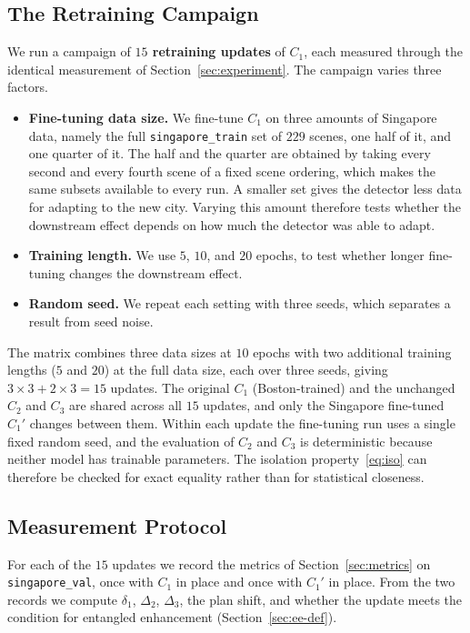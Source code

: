 \documentclass[conference]{IEEEtran}
\begin{document}
\subsection{The Retraining Campaign}
\label{sec:campaign}
We run a campaign of \textbf{$15$ retraining updates} of $C_1$, each measured
through the identical measurement of Section~\ref{sec:experiment}. The campaign varies three factors.
\begin{itemize}
\item \textbf{Fine-tuning data size.} We fine-tune $C_1$ on three amounts of
Singapore data, namely the full \texttt{singapore\_train} set of $229$ scenes,
one half of it, and one quarter of it. The half and the quarter are obtained by
taking every second and every fourth scene of a fixed scene ordering, which makes
the same subsets available to every run. A smaller set gives the detector less data
for adapting to the new city. Varying this amount therefore tests whether the
downstream effect depends on how much the detector was able to adapt.
\item \textbf{Training length.} We use $5$, $10$, and $20$ epochs, to test whether
longer fine-tuning changes the downstream effect.
\item \textbf{Random seed.} We repeat each setting with three seeds, which
separates a result from seed noise.
\end{itemize}
The matrix combines three data sizes at $10$ epochs with two additional training
lengths ($5$ and $20$) at the full data size, each over three seeds, giving
$3\times3 + 2\times3 = 15$ updates. The original $C_1$ (Boston-trained) and the
unchanged $C_2$ and $C_3$ are shared across all $15$ updates, and only the Singapore
fine-tuned $C_1'$ changes between them. Within each update the fine-tuning run uses a
single fixed random seed, and the evaluation of $C_2$ and $C_3$ is deterministic
because neither model has trainable parameters. The isolation
property~\eqref{eq:iso} can therefore be checked for exact equality rather than
for statistical closeness.

\subsection{Measurement Protocol}
For each of the $15$ updates we record the metrics of Section~\ref{sec:metrics} on
\texttt{singapore\_val}, once with $C_1$ in place and once with $C_1'$ in place.
From the two records we compute $\delta_1$, $\Delta_2$, $\Delta_3$, the plan shift,
and whether the update meets the condition for entangled enhancement
(Section~\ref{sec:ee-def}).
\end{document}
